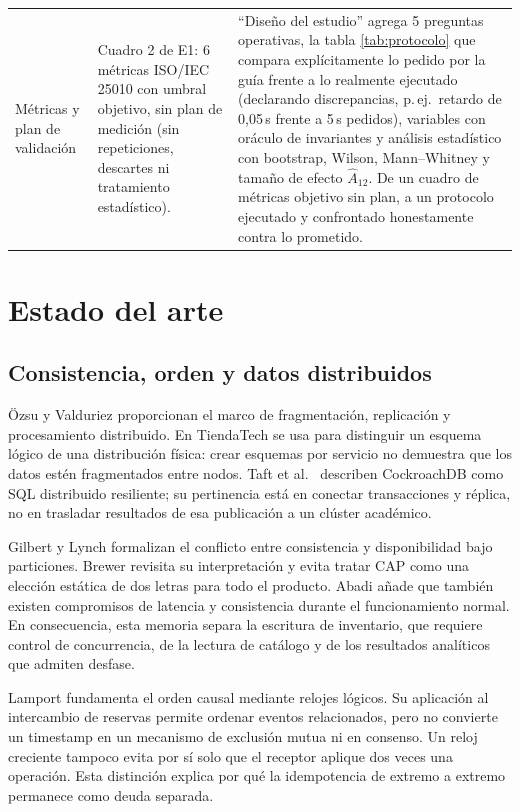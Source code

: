 \documentclass[12pt,a4paper]{article}
\newcommand{\seccion}[1]{\section{#1}}
\begin{document}
\begin{longtable}{>{\raggedright\arraybackslash}p{2.9cm}>{\raggedright\arraybackslash}p{5.5cm}>{\raggedright\arraybackslash}p{6.2cm}}
2.8 Métricas y plan de validación &
Cuadro 2 de E1: 6 métricas ISO/IEC 25010 con umbral objetivo, sin plan de medición (sin repeticiones, descartes ni tratamiento estadístico). &
``Diseño del estudio'' agrega 5 preguntas operativas, la tabla \ref{tab:protocolo} que compara explícitamente lo pedido por la guía frente a lo realmente ejecutado (declarando discrepancias, p.\,ej.\ retardo de 0,05\,s frente a 5\,s pedidos), variables con oráculo de invariantes y análisis estadístico con bootstrap, Wilson, Mann--Whitney y tamaño de efecto $\widehat A_{12}$. De un cuadro de métricas objetivo sin plan, a un protocolo ejecutado y confrontado honestamente contra lo prometido.\\

\end{longtable}



\seccion{Estado del arte}
\subsection{Consistencia, orden y datos distribuidos}
Özsu y Valduriez \cite{ozsu2020principles} proporcionan el marco de fragmentación, replicación y procesamiento distribuido. En TiendaTech se usa para distinguir un esquema lógico de una distribución física: crear esquemas por servicio no demuestra que los datos estén fragmentados entre nodos. Taft et al.\ \cite{taft2020cockroachdb} describen CockroachDB como SQL distribuido resiliente; su pertinencia está en conectar transacciones y réplica, no en trasladar resultados de esa publicación a un clúster académico.

Gilbert y Lynch \cite{gilbert2002} formalizan el conflicto entre consistencia y disponibilidad bajo particiones. Brewer \cite{brewer2012cap} revisita su interpretación y evita tratar CAP como una elección estática de dos letras para todo el producto. Abadi \cite{abadi2012consistency} añade que también existen compromisos de latencia y consistencia durante el funcionamiento normal. En consecuencia, esta memoria separa la escritura de inventario, que requiere control de concurrencia, de la lectura de catálogo y de los resultados analíticos que admiten desfase.

Lamport \cite{lamport1978} fundamenta el orden causal mediante relojes lógicos. Su aplicación al intercambio de reservas permite ordenar eventos relacionados, pero no convierte un timestamp en un mecanismo de exclusión mutua ni en consenso. Un reloj creciente tampoco evita por sí solo que el receptor aplique dos veces una operación. Esta distinción explica por qué la idempotencia de extremo a extremo permanece como deuda separada.
\end{document}
